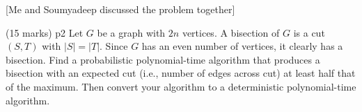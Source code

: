 \documentclass[a4paper, 11pt]{article}
\begin{document}
[Me and Soumyadeep discussed the problem together]\parinn

\begin{problem}{%
		\hfill  (15 marks)
	}{p2%
	}
Let $G$ be a graph with $2 n$ vertices. A bisection of $G$ is a cut $(S, T)$ with $|S|=|T|$. Since $G$ has an even number of vertices, it clearly has a bisection. Find a probabilistic polynomial-time algorithm that produces a bisection with an expected cut (i.e., number of edges across cut) at least half that of the maximum. Then convert your algorithm to a deterministic polynomial-time algorithm.
\end{problem}
\end{document}

